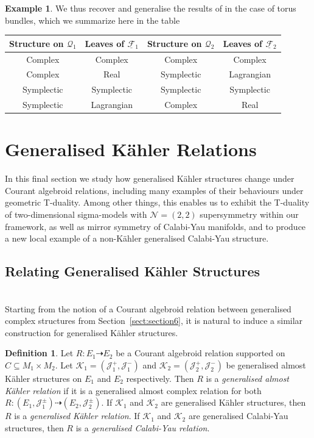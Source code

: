 \documentclass[a4paper, reqno, 11pt]{amsart}
\numberwithin{equation}{section}
\theoremstyle{definition}
\newtheorem{definition}[equation]{Definition}
\newtheorem{example}[equation]{Example}
\newcommand{\red}[1]{\underline{#1}}
\newcommand{\cN}{{\mathcal N}}
\newcommand{\cQ}{{\mathcal Q}}
\newcommand{\cF}{{\mathcal F}}
\newcommand{\cK}{{\mathcal K}}
\newcommand{\cJ}{{\mathcal J}}
\newcommand{\rel}{\dashrightarrow}
\theoremstyle{remark}
\begin{document}
\begin{example}
We thus recover and generalise the results of \cite[Example 4.3, Table 1]{cavalcanti2011generalized} in the case of torus bundles, which we summarize here in the table
\begin{table}[h]
    \centering
    \begin{tabular}{c|c||c|c}
        Structure on $\cQ_1$ & Leaves of $\red\cF{}_1$ & Structure on $\cQ_2$ & Leaves of $\red\cF{}_2$ \\ \hline \hline
        Complex & Complex & Complex & Complex \\ \hline
        Complex & Real & Symplectic & Lagrangian \\ \hline
        Symplectic & Symplectic & Symplectic & Symplectic \\ \hline
        Symplectic & Lagrangian & Complex & Real
    \end{tabular}
    \label{tab:structures_and_fibres}
\end{table}
\end{example}

\medskip

\section{Generalised K\"ahler Relations}\label{sect:section7}
In this final section we study how generalised K\"ahler structures change under Courant algebroid relations, including many examples of their behaviours under geometric T-duality. Among other things, this enables us to exhibit the T-duality of two-dimensional sigma-models with $\cN=(2,2)$ supersymmetry within our framework, as well as mirror symmetry of Calabi-Yau manifolds, and to produce a new local example of a non-K\"ahler generalised Calabi-Yau structure.

\medskip

\subsection{Relating Generalised K\"ahler Structures}~\\[5pt]
Starting from the notion of a Courant algebroid relation between generalised complex structures from Section~\ref{sect:section6}, it is  natural to induce a similar construction for generalised K{\"a}hler structures.

\begin{definition} \label{def:genkahlerrel}
    Let $R\colon E_1 \rel E_2$ be a Courant algebroid relation supported on $C\subseteq M_1\times M_2$. Let $\cK_1 = (\cJ_1^+, \cJ_1^-)$ and $\cK_2 = (\cJ_2^+,\cJ_2^-)$ be generalised almost K\"ahler structures on $E_1$ and $E_2$ respectively.
    Then $R$ is a \emph{generalised almost K\"ahler relation} if it is a generalised almost complex relation for both $R:(E_1, \cJ^\pm_1) \rel (E_2, \cJ^\pm_2)$.
    If $\cK_1$ and $\cK_2$ are generalised K\"ahler structures, then $R$ is a \emph{generalised K\"ahler relation}.
    If $\cK_1$ and $\cK_2$ are generalised Calabi-Yau structures, then $R$ is a \emph{generalised Calabi-Yau relation}.
\end{definition}
\end{document}
